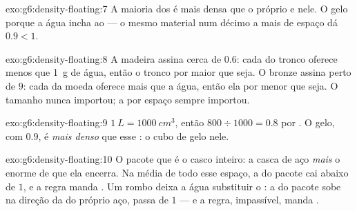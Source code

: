 \begin{solution}{exo:g6:density-floating:7}
A maioria dos  é mais densa que o próprio  e 
nele. O gelo  porque a água incha ao  --- o mesmo
material num décimo a mais de espaço dá  $0.9 < 1$.
\end{solution}

\begin{solution}{exo:g6:density-floating:8}
A madeira assina cerca de $0.6$: cada  do tronco
oferece menos que \qty{1}{g} de água, então o tronco  por maior
que seja. O bronze assina perto de $9$: cada  da
moeda oferece mais que a água, então ela  por menor que seja. O
tamanho nunca importou; a  por espaço sempre importou.
\end{solution}

\begin{solution}{exo:g6:density-floating:9}
$\qty{1}{L} = \qty{1000}{cm^3}$, então $800 \div 1000 = 0.8$ 
por . O gelo, com $0.9$, é \emph{mais denso} que
esse : o cubo de gelo  nele.
\end{solution}

\begin{solution}{exo:g6:density-floating:10}
O pacote que  é o casco inteiro: a casca de aço \emph{mais} o
enorme  de  que ela encerra. Na média de todo esse espaço, a
 do pacote cai abaixo de $1$, e a regra manda . Um
rombo deixa a água substituir o : a  do pacote sobe na
direção da do próprio aço, passa de $1$ --- e a regra, impassível,
manda .
\end{solution}

